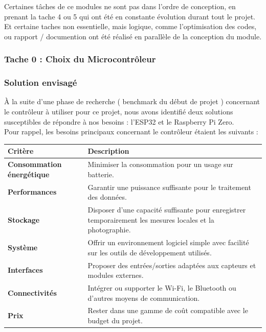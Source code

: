 Certaines tâches de ce modules ne sont pas dans l'ordre de conception, en prenant la tache 4 ou 5 qui ont été en constante évolution 
durant tout le projet. Et certaine taches non essentielle, mais logique, comme l'optimisation des codes, ou rapport / documention ont 
été réalisé en parallèle de la conception du module.
\\

\subsubsection{Tache 0 : Choix du Microcontrôleur}

\subsubsection*{Solution envisagé}

À la suite d’une phase de recherche ( benchmark du début de projet ) concernant le contrôleur à utiliser pour ce projet, nous avons identifié deux solutions susceptibles 
de répondre à nos besoins : l’ESP32 et le Raspberry Pi Zero.
\\

Pour rappel, les besoins principaux concernant le contrôleur étaient les suivants :
\\

\begin{center}
\renewcommand{\arraystretch}{1.3}
\begin{tabularx}{0.9\textwidth}{>{\bfseries}l|X}
\toprule
\textbf{Critère} & \textbf{Description} \\
\midrule
Consommation énergétique & Minimiser la consommation pour un usage sur batterie. \\ 
Performances & Garantir une puissance suffisante pour le traitement des données. \\ 
Stockage & Disposer d’une capacité suffisante pour enregistrer temporairement les mesures locales et la photographie. \\ 
Système & Offrir un environnement logiciel simple avec facilité sur les outils de développement utilisés. \\ 
Interfaces & Proposer des entrées/sorties adaptées aux capteurs et modules externes. \\ 
Connectivités & Intégrer ou supporter le Wi-Fi, le Bluetooth ou d'autres moyens de communication. \\ 
Prix & Rester dans une gamme de coût compatible avec le budget du projet. \\ 
\bottomrule
\end{tabularx}
\end{center}

